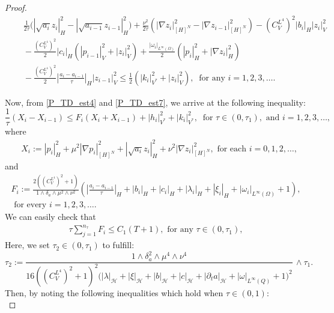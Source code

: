 \documentclass{sinst}
\numberwithin{equation}{section}
\theoremstyle{plain}
\theoremstyle{definition}
\def\sH{\mathscr{H}}
\begin{document}
\begin{proof}
  \begin{align}
    &\quad \frac{1}{2\tau}\bigl( |\sqrt{a_i} z_i|_H^2 - |\sqrt{a_{i-1}} z_{i-1}|_H^2 \bigr) + \frac{\nu^2}{2\tau} (|\nabla z_i|_{[H]^N}^2 - |\nabla z_{i-1}|_{[H]^N}^2) - (C_V^{L^4})^2 |b_i|_H |z_i|_V^2 
    \\
    &\quad - \frac{(C_V^{L^4})^2}{2}|c_i|_H(|p_{i-1}|_V^2 + |z_i|_V^2) + \frac{|\omega_i|_{L^\infty(\Omega)}}{2}(|p_i|_H^2 + |\nabla z_i|_H^2) \label{P_TD_est7}
    \\
    &\quad - \frac{(C_V^{L^4})^2}{2} \left| \frac{a_i - a_{i-1}}{\tau} \right|_H |z_{i-1}|_V^2 \leq \frac{1}{2}(|k_i|_{V^*}^2 + |z_i|_V^2), \ \mbox{ for any } i = 1,2,3,\dots.
  \end{align}

  Now, from \eqref{P_TD_est4} and \eqref{P_TD_est7}, we arrive at the following inequality:
  \begin{equation}
    \frac{1}{\tau}(X_i - X_{i-1}) \leq F_i (X_i + X_{i-1}) + |h_i|_{V^*}^2 + |k_i|_{V^*}^2, \ \mbox{ for } \tau \in (0,\tau_1), \mbox{ and } i = 1,2,3,\dots, \label{P_TD_est8}
  \end{equation}
  where
  \begin{align}
    &X_i := |p_i|_H^2 + \mu^2 |\nabla p_i|_{[H]^N}^2 + |\sqrt{a_i} z_i|_H^2 + \nu^2 |\nabla z_i|_{[H]^N}^2, \mbox{ for each } i = 0,1,2,\dots,
  \end{align}
  and
  \begin{gather}
    F_i := \frac{2((C_V^{L^4})^2 + 1)}{1 \wedge \delta_a \wedge \mu^2 \wedge \nu^2} \left( \left| \frac{a_i - a_{i-1}}{\tau} \right|_H + |b_i|_H + |c_i|_H + |\lambda_i|_H + |\xi_i|_H + |\omega_i|_{L^\infty(\Omega)} + 1 \right),
    \\
    \mbox{ for every } i = 1,2,3,\dots.
  \end{gather}
  We can easily check that
  \begin{align}
    \tau \sum_{j=1}^{n_\tau} F_i \leq C_1 (T + 1), \mbox{ for any } \tau \in (0,\tau_1),
  \end{align}
  Here, we set $\tau_2 \in (0,\tau_1)$ to fulfill:
  \begin{equation}
    \tau_2 := \frac{1 \wedge \delta_a^2 \wedge \mu^4 \wedge \nu^4}{16 ((C_V^{L^4})^2 + 1)^2 \bigl( |\lambda|_\sH + |\xi|_\sH + |b|_\sH + |c|_\sH + |\partial_t a|_\sH + |\omega|_{L^\infty(Q)}+ 1\bigr)^2} \, \wedge \tau_1.
  \end{equation}
  Then, by noting the following inequalities which hold when $\tau \in (0,1)$:
  \begin{equation}

\end{equation}
\end{proof}
\end{document}
